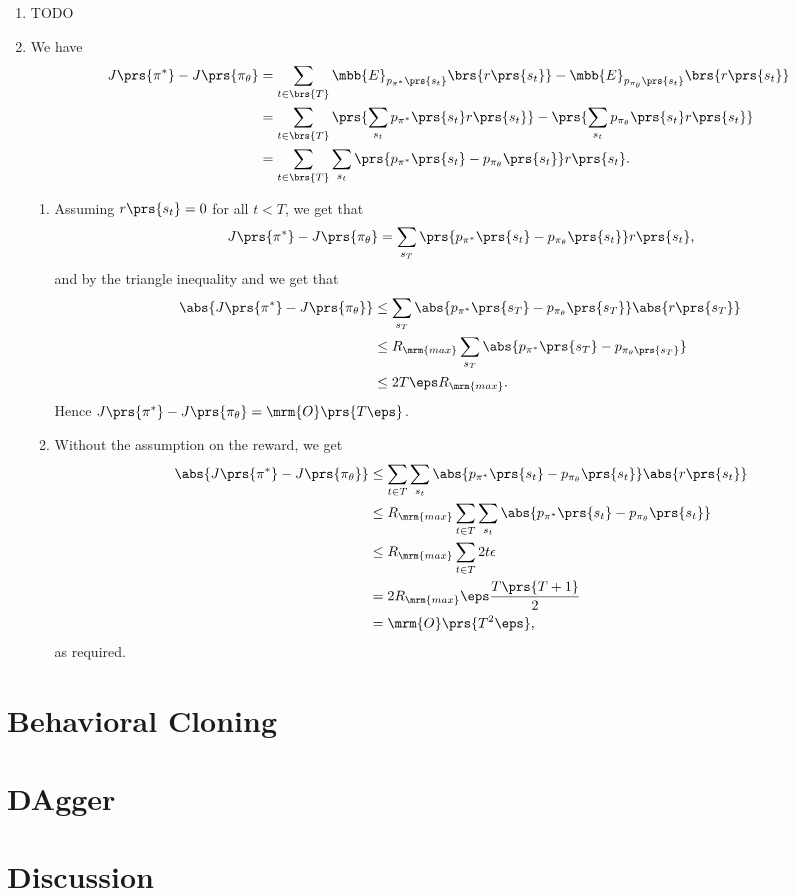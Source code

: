 \documentclass[10pt]{article}
\theoremstyle{definition}
\begin{document}
\begin{enumerate}
\item \label{item:error-inequality}
TODO %

\item
We have
\begin{align*}
J\prs{\pi^*} - J\prs{\pi_{\theta}} &= \sum_{t \in \brs{T}} \mbb{E}_{p_{\pi^*}\prs{s_t}}\brs{r\prs{s_t}} - \mbb{E}_{p_{\pi_{\theta}}\prs{s_t}}\brs{r\prs{s_t}}
\\&= \sum_{t \in \brs{T}} \prs{\sum_{s_t} p_{\pi^*}\prs{s_t} r\prs{s_t}} - \prs{\sum_{s_t} p_{\pi_{\theta}}\prs{s_t} r\prs{s_t}}
\\&=
\sum_{t \in \brs{T}} \sum_{s_t} \prs{p_{\pi^*}\prs{s_t} - p_{\pi_{\theta}}\prs{s_t}} r\prs{s_t} \text{.}
\end{align*}

\begin{enumerate}[label = (\alph*)]
\item
Assuming $r\prs{s_t} = 0$ for all $t < T$, we get that
\begin{align*}
J\prs{\pi^*} - J\prs{\pi_{\theta}} = \sum_{s_T} \prs{p_{\pi^*} \prs{s_t} - p_{\pi_\theta}\prs{s_t}} r\prs{s_t} \text{,}
\end{align*}
and by the triangle inequality and  we get that
\begin{align*}
\abs{J\prs{\pi^*} - J\prs{\pi_{\theta}}} &\leq \sum_{s_T} \abs{p_{\pi^*} \prs{s_T} - p_{\pi_\theta}\prs{s_T}} \abs{r\prs{s_T}}
\\&\leq R_{\mrm{max}} \sum_{s_T} \abs{p_{\pi^*}\prs{s_T} - p_{\pi_\theta\prs{s_T}}}
\\&\leq 2 T \eps R_{\mrm{max}} \text{.}
\end{align*}
Hence $J\prs{\pi^*} - J\prs{\pi_\theta} = \mrm{O}\prs{T \eps}$.

\item
Without the assumption on the reward, we get
\begin{align*}
\abs{J\prs{\pi^*} - J\prs{\pi_{\theta}}} &\leq \sum_{t \in T} \sum_{s_t} \abs{p_{\pi^*}\prs{s_t} - p_{\pi_\theta}\prs{s_t}} \abs{r\prs{s_t}}
\\&\leq R_{\mrm{max}} \sum_{t \in T} \sum_{s_t} \abs{p_{\pi^*}\prs{s_t} - p_{\pi_\theta}\prs{s_t}}
\\&\leq R_{\mrm{max}} \sum_{t \in T} 2 t \epsilon
\\&= 2 R_{\mrm{max}} \eps \frac{T \prs{T+1}}{2}
\\&= \mrm{O}\prs{T^2 \eps} \text{,}
\end{align*}
as required.
\end{enumerate}

\end{enumerate}


\setcounter{section}{2}
\section{Behavioral Cloning}

\section{DAgger}

\section{Discussion}

\printbibliography
\printindex
\end{document}
